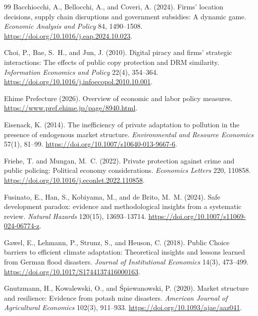 \begin{thebibliography}{99}
Bacchiocchi, A., Bellocchi, A., and Coveri, A. (2024).
\newblock Firms' location decisions, supply chain disruptions and government subsidies: A dynamic game.
\newblock \emph{Economic Analysis and Policy} 84, 1490--1508. \url{https://doi.org/10.1016/j.eap.2024.10.023}.

Choi, P., Bae, S.~H., and Jun, J. (2010).
\newblock Digital piracy and firms' strategic interactions: The effects of public copy protection and DRM similarity.
\newblock \emph{Information Economics and Policy} 22(4), 354--364. \url{https://doi.org/10.1016/j.infoecopol.2010.10.001}.

Ehime Prefecture (2026).
\newblock Overview of economic and labor policy measures.
\newblock \url{https://www.pref.ehime.jp/page/8940.html}.

Eisenack, K. (2014).
\newblock The inefficiency of private adaptation to pollution in the presence of endogenous market structure.
\newblock \emph{Environmental and Resource Economics} 57(1), 81--99. \url{https://doi.org/10.1007/s10640-013-9667-6}.

Friehe, T. and Mungan, M.~C. (2022).
\newblock Private protection against crime and public policing: Political economy considerations.
\newblock \emph{Economics Letters} 220, 110858. \url{https://doi.org/10.1016/j.econlet.2022.110858}.

Fusinato, E., Han, S., Kobiyama, M., and de Brito, M.~M. (2024).
\newblock Safe development paradox: evidence and methodological insights from a systematic review.
\newblock \emph{Natural Hazards} 120(15), 13693--13714. \url{https://doi.org/10.1007/s11069-024-06774-z}.

Gawel, E., Lehmann, P., Strunz, S., and Heuson, C. (2018).
\newblock Public Choice barriers to efficient climate adaptation: Theoretical insights and lessons learned from German flood disasters.
\newblock \emph{Journal of Institutional Economics} 14(3), 473--499. \url{https://doi.org/10.1017/S1744137416000163}.

Gnutzmann, H., Kowalewski, O., and \'Spiewanowski, P. (2020).
\newblock Market structure and resilience: Evidence from potash mine disasters.
\newblock \emph{American Journal of Agricultural Economics} 102(3), 911--933. \url{https://doi.org/10.1093/ajae/aaz041}.


\end{thebibliography}
